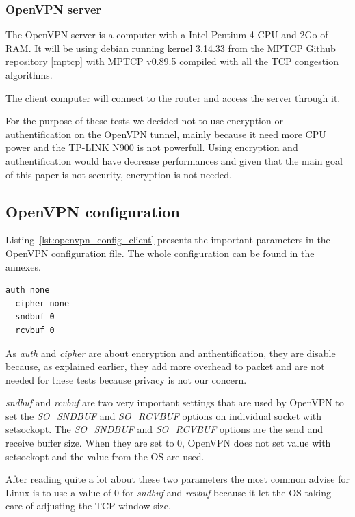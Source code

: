   \subsubsection{OpenVPN server}
  The OpenVPN server is a computer with a Intel Pentium 4 CPU and 2Go of RAM.
  It will be using debian running kernel 3.14.33 from the MPTCP Github repository \ref{mptcp} with MPTCP v0.89.5 compiled with all the TCP congestion algorithms.

  The client computer will connect to the router and access the server through it.

  For the purpose of these tests we decided not to use encryption or authentification on the OpenVPN tunnel, mainly because it need more CPU power and the TP-LINK N900 is not powerfull.
  Using encryption and authentification would have decrease performances and given that the main goal of this paper is not security, encryption is not needed.

  \subsection{OpenVPN configuration} \label{sec:openvpn_config}

  Listing~\ref{lst:openvpn_config_client} presents the important parameters in the OpenVPN configuration file. The whole configuration can be found in the annexes.

  \begin{lstlisting}[caption={Openvpn configuration},label={lst:openvpn_config_client}]
  auth none
  cipher none
  sndbuf 0
  rcvbuf 0\end{lstlisting}

  As \textit{auth} and \textit{cipher} are about encryption and anthentification, they are disable because, as explained earlier,
  they add more overhead to packet and are not needed for these tests because privacy is not our concern.

  \textit{sndbuf} and \textit{rcvbuf} are two very important settings that are used by OpenVPN to set the \textit{SO\_SNDBUF} and \textit{SO\_RCVBUF} options on individual socket with setsockopt.
  The \textit{SO\_SNDBUF} and \textit{SO\_RCVBUF} options are the send and receive buffer size.
  When they are set to 0, OpenVPN does not set value with setsockopt and the value from the OS are used.

  After reading quite a lot about these two parameters the most common advise for Linux is to use a value of 0 for \textit{sndbuf} and \textit{rcvbuf} because it let the
  OS taking care of adjusting the TCP window size.

